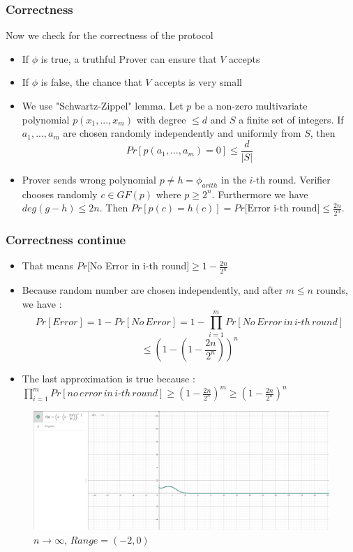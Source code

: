 \documentclass[hyperref={pdfpagelabels=false},t,10pt]{beamer}
\begin{document}
\begin{frame}
  \frametitle{Correctness}

  Now we check for the correctness of the protocol
  \begin{itemize}
    \item If $\phi$ is true, a truthful Prover can ensure that $V$ accepts \pause
    \item If $\phi$ is false, the chance that $V$ accepts is very small \pause
    \item We use "Schwartz-Zippel" lemma. Let $p$ be a non-zero multivariate polynomial $p(x_1,...,x_m)$ with degree $\leq d$ and $S$ a finite set of integers.
    If $a_1,..., a_m$ are chosen randomly independently and uniformly from $S$, then $$Pr[p(a_1,...,a_m)= 0] \leq \frac{d}{|S|}$$ \pause
    \item Prover sends wrong polynomial $p \neq h =\phi_{arith}$ in the $i$-th round. Verifier chooses randomly $c\in GF(p)$ where $p\geq 2^n$. Furthermore we have $deg(g-h) \leq 2n$.
    Then $Pr[p(c) = h(c)] = Pr\mbox{[Error i-th round]} \leq \frac{2n}{2^n}$.
  \end{itemize}
\end{frame}

\begin{frame}
  \frametitle{Correctness continue}
  \begin{itemize}
    \item That means $Pr$[No Error in i-th round]$\geq 1- \frac{2n}{2^n}$
    \item Because random number are chosen independently, and after $m \leq n$ rounds, we have : 
    $$Pr[Error] = 1 - Pr[No \, Error] = 1- \prod_{i=1}^{m} Pr[No \, Error \,in \,i \mbox{-}   th  \,round]$$
    $$ \leq (1-(1-\frac{2n}{2^n}))^n$$ \newline
    \item  The last approximation is true because : $\prod_{i=1}^{m} Pr[no \,error \, in \, i\mbox{-}th \, round] \geq (1-\frac{2n}{2^n})^m \geq (1- \frac{2n}{2^n})^n$
  \end{itemize}
\end{frame}

\begin{frame}
  \begin{figure}[h]
    \centering
    \includegraphics[scale= 0.25]{Copy.png}
    \caption{$n \rightarrow \infty$, $Range = (-2,0)$}
  \end{figure}
\end{frame}
\end{document}
